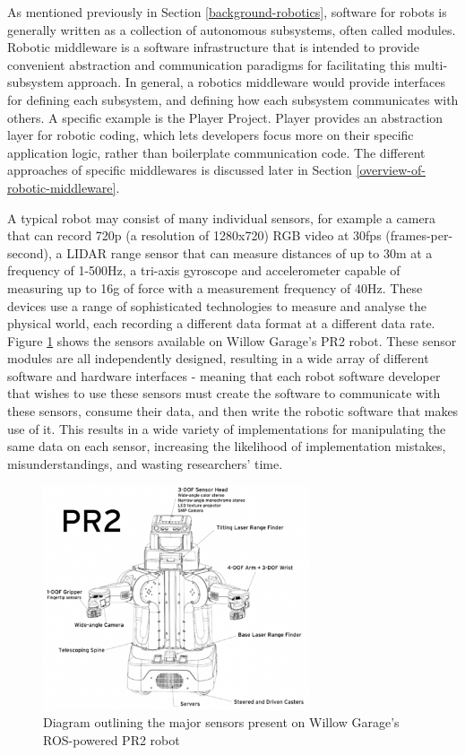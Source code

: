 \documentclass[../dissertation.tex]{subfiles}
\begin{document}
As mentioned previously in Section \ref{background-robotics}, software for robots is generally written as a collection of autonomous subsystems, often called modules. Robotic middleware is a software infrastructure that is intended to provide convenient abstraction and communication paradigms for facilitating this multi-subsystem approach. In general, a robotics middleware would provide interfaces for defining each subsystem, and defining how each subsystem communicates with others. A specific example is the Player Project. Player provides an abstraction layer for robotic coding, which lets developers focus more on their specific application logic, rather than boilerplate communication code\cite{vaughan2003device}. The different approaches of specific middlewares is discussed later in Section \ref{overview-of-robotic-middleware}.

A typical robot may consist of many individual sensors, for example a camera that can record 720p (a resolution of 1280x720) RGB video at 30fps (frames-per-second), a LIDAR range sensor that can measure distances of up to 30m at a frequency of 1-500Hz, a tri-axis gyroscope and accelerometer capable of measuring up to 16g of force with a measurement frequency of 40Hz. These devices use a range of sophisticated technologies to measure and analyse the physical world, each recording a different data format at a different data rate. Figure \ref{pr2-diagram} shows the sensors available on Willow Garage's PR2 robot. These sensor modules are all independently designed, resulting in a wide array of different software and hardware interfaces - meaning that each robot software developer that wishes to use these sensors must create the software to communicate with these sensors, consume their data, and then write the robotic software that makes use of it. This results in a wide variety of implementations for manipulating the same data on each sensor, increasing the likelihood of implementation mistakes, misunderstandings, and wasting researchers' time.

\begin{figure}[H]
\centering

\includegraphics[width=0.7\textwidth]{images/background/Williow-Garage-PR2-Drawing-Diagram.png}
\caption{Diagram outlining the major sensors present on Willow Garage's ROS-powered PR2 robot\cite{pr2OverviewDiagram}}
\label{pr2-diagram}
\end{figure}
\end{document}
